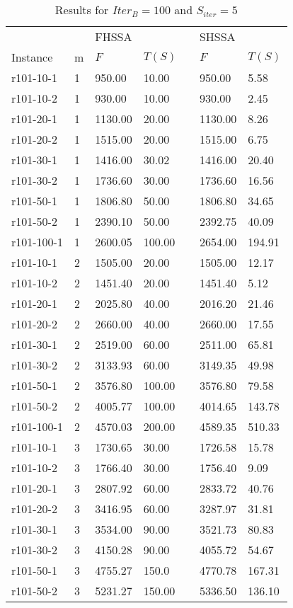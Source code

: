 \documentclass[final,5p,times,twocolumn]{elsarticle}
\begin{document}
{{{{\renewcommand{\arraystretch}{1.2}
\begin{table}[htbp]
\centering
\caption{Results for $Iter_{B}=100$ and $S_{iter}=5$}
\centering
\begin{tabular}{l l l l l l l}
\hline 
&&\multicolumn{2}{l}{FHSSA}&& \multicolumn{2}{l}{SHSSA}\\
\cline{3-4}\cline{6-7}
Instance & m & $F$ & $T(S)$ && $F$ & $T(S)$\\
\hline
r101-10-1&1&950.00&10.00&&950.00&5.58\\
r101-10-2&1&930.00&10.00&&930.00&2.45\\
r101-20-1&1&1130.00&20.00&&1130.00&8.26\\
r101-20-2&1&1515.00&20.00&&1515.00&6.75\\
r101-30-1&1&1416.00&30.02&&1416.00&20.40\\
r101-30-2&1&1736.60&30.00&&1736.60&16.56\\
r101-50-1&1&1806.80&50.00&&1806.80&34.65\\
r101-50-2&1&2390.10&50.00&&2392.75&40.09\\
r101-100-1&1&2600.05&100.00&&2654.00&194.91\\
r101-10-1&2&1505.00&20.00&&1505.00&12.17\\
r101-10-2&2&1451.40&20.00&&1451.40&5.12\\
r101-20-1&2&2025.80&40.00&&2016.20&21.46\\
r101-20-2&2&2660.00&40.00&&2660.00&17.55\\
r101-30-1&2&2519.00&60.00&&2511.00&65.81\\
r101-30-2&2&3133.93&60.00&&3149.35&49.98\\
r101-50-1&2&3576.80&100.00&&3576.80&79.58\\
r101-50-2&2&4005.77&100.00&&4014.65&143.78\\
r101-100-1&2&4570.03&200.00&&4589.35&510.33\\
r101-10-1&3&1730.65&30.00&&1726.58&15.78\\
r101-10-2&3&1766.40&30.00&&1756.40&9.09\\
r101-20-1&3&2807.92&60.00&&2833.72&40.76\\
r101-20-2&3&3416.95&60.00&&3287.97&31.81\\
r101-30-1&3&3534.00&90.00&&3521.73&80.83\\
r101-30-2&3&4150.28&90.00&&4055.72&54.67\\
r101-50-1&3&4755.27&150.0&&4770.78&167.31\\
r101-50-2&3&5231.27&150.00&&5336.50&136.10\\

\end{tabular}
\end{table}}}}}
\end{document}
